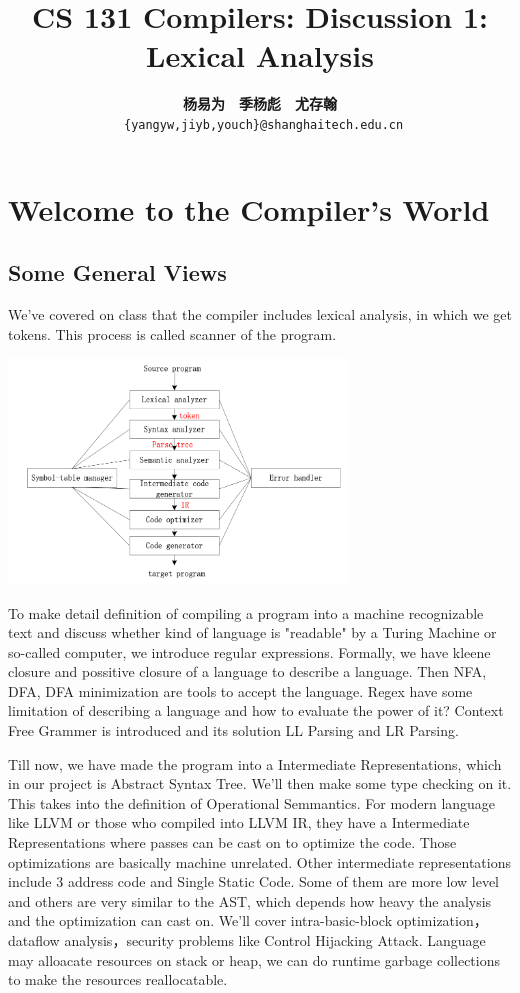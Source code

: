 \documentclass[a4paper]{article}
\title{CS 131 Compilers: Discussion 1: Lexical Analysis}
\author{\textbf{杨易为}~~\textbf{季杨彪}~~\textbf{尤存翰} \\ \texttt{ \{yangyw,jiyb,youch\}@shanghaitech.edu.cn}}
\theoremstyle{definition}
\begin{document}
\maketitle
\tableofcontents
\section{Welcome to the Compiler's World}
\subsection{Some General Views}

We've covered on class that the compiler includes lexical analysis, in which we get tokens. This process is called scanner of the program.
\begin{center}
\includegraphics[height=6cm]{img/01-phases.png}
\end{center}

To make detail definition of compiling a program into a machine recognizable text and discuss whether kind of language is "readable" by a Turing Machine or so-called computer, we introduce regular expressions. Formally, we have kleene closure and possitive closure of a language to describe a language. Then NFA, DFA, DFA minimization are tools to accept the language. Regex have some limitation of describing a language and how to evaluate the power of it? Context Free Grammer is introduced and its solution LL Parsing and LR Parsing.

Till now, we have made the program into a Intermediate Representations, which in our project is Abstract Syntax Tree. We'll then make some type checking on it. This takes into the definition of Operational Semmantics. For modern language like LLVM or those who compiled into LLVM IR, they have a Intermediate Representations where passes can be cast on to optimize the code. Those optimizations are basically machine unrelated. Other intermediate representations include 3 address code and Single Static Code. Some of them are more low level and others are very similar to the AST, which depends how heavy the analysis and the optimization can cast on. We'll cover intra-basic-block optimization，dataflow analysis，security problems like Control Hijacking Attack. Language may alloacate resources on stack or heap, we can do runtime garbage collections to make the resources reallocatable.
\end{document}
